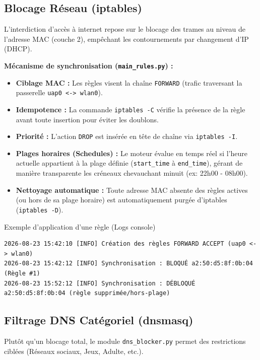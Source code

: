 \documentclass[11pt,a4paper]{article}
\begin{document}
\subsection{Blocage Réseau (iptables)}
L'interdiction d'accès à internet repose sur le blocage des trames au niveau de l'adresse MAC (couche 2), empêchant les contournements par changement d'IP (DHCP).

\textbf{Mécanisme de synchronisation (\texttt{main\_rules.py}) :}
\begin{itemize}
    \item \textbf{Ciblage MAC :} Les règles visent la chaîne \texttt{FORWARD} (trafic traversant la passerelle \texttt{uap0 <-> wlan0}).
    \item \textbf{Idempotence :} La commande \texttt{iptables -C} vérifie la présence de la règle avant toute insertion pour éviter les doublons.
    \item \textbf{Priorité :} L'action \texttt{DROP} est insérée en tête de chaîne via \texttt{iptables -I}.
    \item \textbf{Plages horaires (Schedules) :} Le moteur évalue en temps réel si l'heure actuelle appartient à la plage définie (\texttt{start\_time} à \texttt{end\_time}), gérant de manière transparente les créneaux chevauchant minuit (ex: 22h00 - 08h00).
    \item \textbf{Nettoyage automatique :} Toute adresse MAC absente des règles actives (ou hors de sa plage horaire) est automatiquement purgée d'iptables (\texttt{iptables -D}).
\end{itemize}

\begin{stepcadre}{Exemple d'application d'une règle (Logs console)}
\begin{lstlisting}[language=BashShell]
2026-08-23 15:42:10 [INFO] Création des règles FORWARD ACCEPT (uap0 <-> wlan0)
2026-08-23 15:42:12 [INFO] Synchronisation : BLOQUÉ a2:50:d5:8f:0b:04 (Règle #1)
2026-08-23 15:52:12 [INFO] Synchronisation : DÉBLOQUÉ a2:50:d5:8f:0b:04 (règle supprimée/hors-plage)
\end{lstlisting}
\end{stepcadre}

\subsection{Filtrage DNS Catégoriel (dnsmasq)}
Plutôt qu'un blocage total, le module \texttt{dns\_blocker.py} permet des restrictions ciblées (Réseaux sociaux, Jeux, Adulte, etc.).
\end{document}
